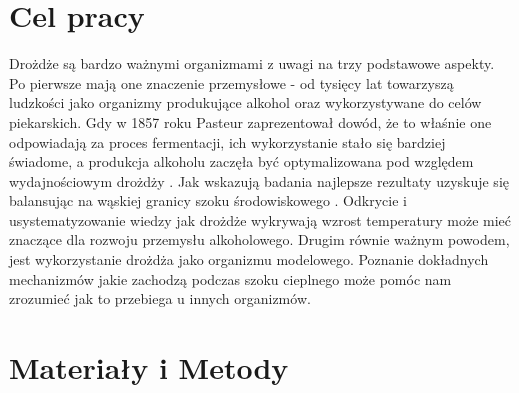 \documentclass{pracamgr}
\begin{document}




\chapter{Cel pracy}

Drożdże są bardzo ważnymi organizmami z uwagi na trzy podstawowe aspekty. Po pierwsze 
mają one znaczenie przemysłowe - od tysięcy lat towarzyszą ludzkości jako organizmy 
produkujące alkohol oraz wykorzystywane do celów piekarskich. Gdy w 1857 roku Pasteur 
zaprezentował dowód, że to właśnie one odpowiadają za proces fermentacji, ich wykorzystanie 
stało się bardziej świadome, a produkcja alkoholu zaczęła być optymalizowana 
pod względem wydajnościowym drożdży \cite{100years}. Jak wskazują badania najlepsze rezultaty 
uzyskuje się balansując na wąskiej granicy szoku środowiskowego \cite{Stresstolerance}. Odkrycie i usystematyzowanie wiedzy 
jak drożdże wykrywają wzrost temperatury może mieć znaczące dla rozwoju przemysłu alkoholowego. 
Drugim równie ważnym powodem, jest wykorzystanie drożdża jako organizmu modelowego. Poznanie dokładnych mechanizmów
jakie zachodzą podczas szoku cieplnego może pomóc nam zrozumieć jak to przebiega u innych organizmów. 





% 

\chapter{Materiały i Metody}
\end{document}
